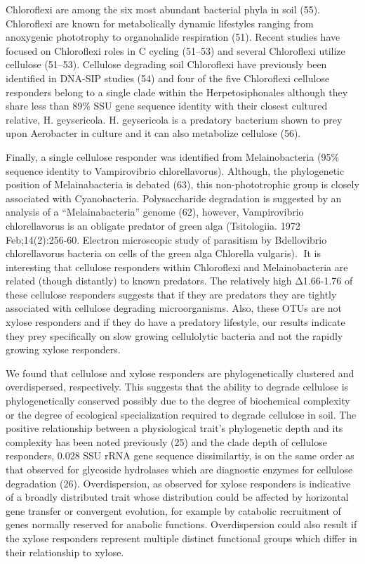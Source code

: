 Chloroflexi are among the six most abundant bacterial phyla in soil (55).
Chloroflexi are known for metabolically dynamic lifestyles ranging from
anoxygenic phototrophy to organohalide respiration (51). Recent studies have
focused on Chloroflexi roles in C cycling (51–53) and several Chloroflexi
utilize cellulose (51–53). Cellulose degrading soil Chloroflexi have previously
been identified in DNA-SIP studies (54) and four of the five Chloroflexi
cellulose responders belong to a single clade within the Herpetosiphonales
although they share less than 89\% SSU gene sequence identity with their
closest cultured relative, H. geysericola. H. geysericola is a predatory
bacterium shown to prey upon Aerobacter in culture and it can also metabolize
cellulose (56). 

Finally, a single cellulose responder was identified from Melainobacteria (95\%
sequence identity to Vampirovibrio chlorellavorus). Although, the phylogenetic
position of Melainabacteria is debated (63), this non-phototrophic group is
closely associated with Cyanobacteria. Polysaccharide degradation is suggested
by an analysis of a “Melainabacteria” genome (62), however, Vampirovibrio
chlorellavorus is an obligate predator of green alga (Tsitologiia. 1972
Feb;14(2):256-60. Electron microscopic study of parasitism by Bdellovibrio
chlorellavorus bacteria on cells of the green alga Chlorella vulgaris). It is
interesting that cellulose responders within Chloroflexi and Melainobacteria
are related (though distantly) to known predators. The relatively high
Δ1.66-1.76 of these cellulose responders suggests that if they are predators
they are tightly associated with cellulose degrading microorganisms. Also,
these OTUs are not xylose responders and if they do have a predatory lifestyle,
our results  indicate they prey specifically on slow growing cellulolytic
bacteria and not the rapidly growing xylose responders. 

We found that cellulose and xylose responders are phylogenetically clustered
and overdispersed, respectively. This suggests that the ability to degrade
cellulose is phylogenetically conserved possibly due to the degree of
biochemical complexity or the degree of ecological specialization required to
degrade cellulose in soil. The positive relationship between a physiological
trait’s phylogenetic depth and its complexity has been noted previously (25)
and the clade depth of cellulose responders, 0.028 SSU rRNA gene sequence
dissimilartiy, is on the same order as that observed for glycoside hydrolases
which are diagnostic enzymes for cellulose degradation (26). Overdispersion, as
observed for xylose responders is indicative of a broadly distributed trait
whose distribution could be affected by horizontal gene transfer or convergent
evolution, for example by catabolic recruitment of genes normally reserved for
anabolic functions. Overdispersion could also result if the xylose responders
represent multiple distinct functional groups which differ in their
relationship to xylose. 

